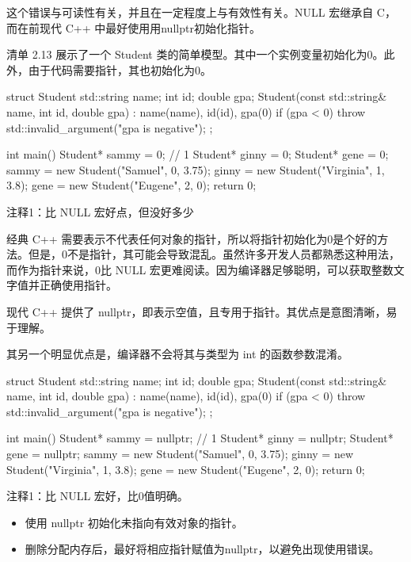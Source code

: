 这个错误与可读性有关，并且在一定程度上与有效性有关。NULL 宏继承自 C，而在前现代 C++ 中最好使用用nullptr初始化指针。


清单 2.13 展示了一个 Student 类的简单模型。其中一个实例变量初始化为0。此外，由于代码需要指针，其也初始化为0。


\begin{cpp}
struct Student {
  std::string name;
  int id;
  double gpa;
  Student(const std::string& name, int id, double gpa) : name(name),
          id(id), gpa(0) {
    if (gpa < 0)
      throw std::invalid_argument("gpa is negative");
  }
};

int main() {
  Student* sammy = 0; // 1
  Student* ginny = 0;
  Student* gene = 0;
  sammy = new Student("Samuel", 0, 3.75);
  ginny = new Student("Virginia", 1, 3.8);
  gene = new Student("Eugene", 2, 0);
  return 0;
}
\end{cpp}

{\footnotesize
注释1：比 NULL 宏好点，但没好多少
}


经典 C++ 需要表示不代表任何对象的指针，所以将指针初始化为0是个好的方法。但是，0不是指针，其可能会导致混乱。虽然许多开发人员都熟悉这种用法，而作为指针来说，0比 NULL 宏更难阅读。因为编译器足够聪明，可以获取整数文字值并正确使用指针。


现代 C++ 提供了 nullptr，即表示空值，且专用于指针。其优点是意图清晰，易于理解。

其另一个明显优点是，编译器不会将其与类型为 int 的函数参数混淆。


\begin{cpp}
struct Student {
  std::string name;
  int id;
  double gpa;
  Student(const std::string& name, int id, double gpa) : name(name),
          id(id), gpa(0) {
    if (gpa < 0)
      throw std::invalid_argument("gpa is negative");
  }
};

int main() {
  Student* sammy = nullptr; // 1
  Student* ginny = nullptr;
  Student* gene = nullptr;
  sammy = new Student("Samuel", 0, 3.75);
  ginny = new Student("Virginia", 1, 3.8);
  gene = new Student("Eugene", 2, 0);
  return 0;
}
\end{cpp}

{\footnotesize
注释1：比 NULL 宏好，比0值明确。
}


\begin{itemize}
\item
使用 nullptr 初始化未指向有效对象的指针。

\item
删除分配内存后，最好将相应指针赋值为nullptr，以避免出现使用错误。
\end{itemize}
